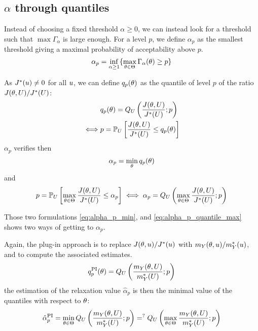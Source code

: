 \documentclass[../../Main_ManuscritThese.tex]{subfiles}
\begin{document}
\subsection{$\alpha$ through quantiles}
Instead of choosing a fixed threshold $\alpha \geq 0$, we can instead look for a threshold such that $\max \Gamma_{\alpha}$ is large enough.
For a level $p$, we define $\alpha_p$ as the smallest threshold giving a maximal probability of acceptability above $p$.
\begin{equation}
  \alpha_p = \inf_{\alpha \geq 1}\{\max_{\theta \in \Theta}\Gamma_{\alpha}(\theta)\geq p \}
\end{equation}

As $J^*(u) \neq 0$ for all $u$, we can define $q_{p}(\theta)$ as the quantile of level $p$ of the ratio $J(\theta, U) / J^*(U)$:
\begin{align}
       & q_{p}(\theta) = Q_{U}\left(\frac{J(\theta, U)}{J^*(U)};p\right) \\
  \iff &p          = \mathbb{P}_{U}\left[\frac{J(\theta, U)}{J^*(U)} \leq q_{p}(\theta)\right]
\end{align}
$\alpha_p$ verifies then
\begin{equation}
  \label{eq:alpha_p_min}
\alpha_p = \min_{\theta} q_p(\theta)
\end{equation}
and 
\begin{equation}
  \label{eq:alpha_p_quantile_max}
  p = \mathbb{P}_{U}\left[\max_{\theta \in \Theta}\frac{J(\theta, U)}{J^*(U)} \leq \alpha_p\right] \iff \alpha_p = Q_{U}\left(\max_{\theta\in\Theta} \frac{J(\theta,U)}{J^*(U)};p\right)
\end{equation}

Those two formulations \cref{eq:alpha_p_min}, and \cref{eq:alpha_p_quantile_max} shows two ways of getting to $\alpha_p$.

Again, the plug-in approach is to replace $J(\theta, u)/J^*(u)$ with $m_Y(\theta, u) / m^*_Y(u)$, and to compute the associated estimates.
\begin{equation}
  q_{p}^{\mathrm{PI}}(\theta) = Q_{U}\left(\frac{m_Y(\theta, U)}{m^*_Y(U)};p\right)
\end{equation}
the estimation of the relaxation value $\hat{\alpha}_p$ is then the minimal value of the quantiles with respect to $\theta$:
\begin{equation}
    \label{eq:def_plugin_alpha}
  \hat{\alpha}^{\mathrm{PI}}_p = \min_{\theta \in \Theta} Q_U\left(\frac{m_Y(\theta, U)}{m^*_Y(U)};p\right) =^{?} Q_{U}\left(\max_{\theta\in\Theta} \frac{m_Y(\theta,U)}{m_Y^*(U)};p\right)
\end{equation}
\end{document}
